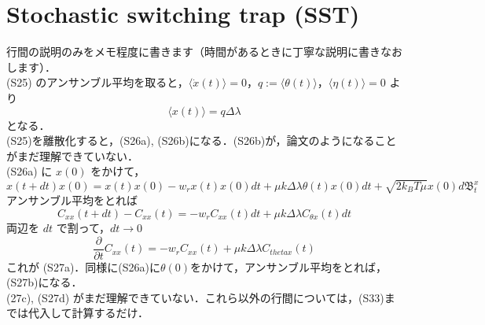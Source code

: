 \documentclass{jsarticle}
\numberwithin{equation}{section}
\theoremstyle{definition}
\begin{document}
\section{Stochastic switching trap (SST)}
行間の説明のみをメモ程度に書きます（時間があるときに丁寧な説明に書きなおします）．\\
\quad (S25) のアンサンブル平均を取ると，$\langle \dot{x}(t) \rangle = 0$，$q := \langle \theta (t)\rangle$，$\langle \eta (t) \rangle = 0$ より
\begin{equation}
  \langle x(t) \rangle = q \Delta \lambda
\end{equation}
となる．\\
\quad (S25)を離散化すると，(S26a), (S26b)になる．(S26b)が，論文のようになることがまだ理解できていない．\\
\quad (S26a) に $x(0)$ をかけて，
\begin{equation}
  x(t + dt)x(0) = x(t)x(0) - w_r x(t) x(0) dt + \mu k \Delta \lambda \theta (t) x(0) dt + \sqrt{2 k_B T \mu } x(0) d \mathfrak{B}_t^x  
\end{equation}
アンサンブル平均をとれば
\begin{equation}
  C_{xx} (t + dt) - C_{xx} (t) = - w_r C_{xx}(t) dt + \mu k \Delta \lambda C_{\theta x} (t) dt 
\end{equation}
両辺を $dt$ で割って，$dt \to 0$
\begin{equation}
  \frac{\partial }{\partial t} C_{xx} (t) = -w_r C_{xx} (t) + \mu k \Delta \lambda C_{theta x} (t) 
\end{equation}
これが (S27a)．同様に(S26a)に$\theta (0)$をかけて，アンサンブル平均をとれば，(S27b)になる．\\
\quad (27c), (S27d) がまだ理解できていない．これら以外の行間については，(S33)までは代入して計算するだけ．
\end{document}
